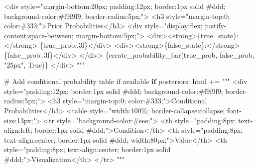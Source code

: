 \documentclass[
  11pt,
  letterpaper,
]{book}
\newenvironment{Shaded}{\begin{snugshade}}{\end{snugshade}}
\newcommand{\CommentTok}[1]{\textcolor[rgb]{0.37,0.37,0.37}{#1}}
\newcommand{\ControlFlowTok}[1]{\textcolor[rgb]{0.00,0.23,0.31}{\textbf{#1}}}
\newcommand{\NormalTok}[1]{\textcolor[rgb]{0.00,0.23,0.31}{#1}}
\newcommand{\OperatorTok}[1]{\textcolor[rgb]{0.37,0.37,0.37}{#1}}
\newcommand{\SpecialCharTok}[1]{\textcolor[rgb]{0.37,0.37,0.37}{#1}}
\newcommand{\SpecialStringTok}[1]{\textcolor[rgb]{0.13,0.47,0.30}{#1}}
\newcommand{\StringTok}[1]{\textcolor[rgb]{0.13,0.47,0.30}{#1}}
\newcommand{\VariableTok}[1]{\textcolor[rgb]{0.07,0.07,0.07}{#1}}
\begin{document}
\begin{Shaded}
\begin{Highlighting}[]
\SpecialStringTok{        \textless{}div style="margin{-}bottom:20px; padding:12px; border:1px solid \#ddd; background{-}color:\#f9f9f9; border{-}radius:5px;"\textgreater{}}
\SpecialStringTok{            \textless{}h3 style="margin{-}top:0; color:\#333;"\textgreater{}Prior Probabilities\textless{}/h3\textgreater{}}
\SpecialStringTok{            \textless{}div style="display:flex; justify{-}content:space{-}between; margin{-}bottom:5px;"\textgreater{}}
\SpecialStringTok{                \textless{}div\textgreater{}\textless{}strong\textgreater{}}\SpecialCharTok{\{}\NormalTok{true\_state}\SpecialCharTok{\}}\SpecialStringTok{:\textless{}/strong\textgreater{} }\SpecialCharTok{\{}\NormalTok{true\_prob}\SpecialCharTok{:.3f\}}\SpecialStringTok{\textless{}/div\textgreater{}}
\SpecialStringTok{                \textless{}div\textgreater{}\textless{}strong\textgreater{}}\SpecialCharTok{\{}\NormalTok{false\_state}\SpecialCharTok{\}}\SpecialStringTok{:\textless{}/strong\textgreater{} }\SpecialCharTok{\{}\NormalTok{false\_prob}\SpecialCharTok{:.3f\}}\SpecialStringTok{\textless{}/div\textgreater{}}
\SpecialStringTok{            \textless{}/div\textgreater{}}
\SpecialStringTok{            }\SpecialCharTok{\{}\NormalTok{create\_probability\_bar(true\_prob, false\_prob, }\StringTok{"25px"}\NormalTok{, }\VariableTok{True}\NormalTok{)}\SpecialCharTok{\}}
\SpecialStringTok{        \textless{}/div\textgreater{}}
\SpecialStringTok{    """}

    \CommentTok{\# Add conditional probability table if available}
    \ControlFlowTok{if}\NormalTok{ posteriors:}
\NormalTok{        html }\OperatorTok{+=} \StringTok{"""}
\StringTok{        \textless{}div style="padding:12px; border:1px solid \#ddd; background{-}color:\#f9f9f9; border{-}radius:5px;"\textgreater{}}
\StringTok{            \textless{}h3 style="margin{-}top:0; color:\#333;"\textgreater{}Conditional Probabilities\textless{}/h3\textgreater{}}
\StringTok{            \textless{}table style="width:100\%; border{-}collapse:collapse; font{-}size:13px;"\textgreater{}}
\StringTok{                \textless{}tr style="background{-}color:\#eee;"\textgreater{}}
\StringTok{                    \textless{}th style="padding:8px; text{-}align:left; border:1px solid \#ddd;"\textgreater{}Condition\textless{}/th\textgreater{}}
\StringTok{                    \textless{}th style="padding:8px; text{-}align:center; border:1px solid \#ddd; width:80px;"\textgreater{}Value\textless{}/th\textgreater{}}
\StringTok{                    \textless{}th style="padding:8px; text{-}align:center; border:1px solid \#ddd;"\textgreater{}Visualization\textless{}/th\textgreater{}}
\StringTok{                \textless{}/tr\textgreater{}}
\StringTok{        """}


\end{Highlighting}
\end{Shaded}
\end{document}
